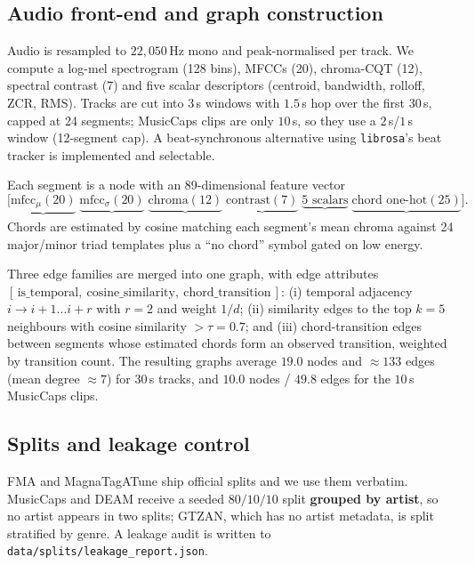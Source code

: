 \documentclass{article}
\begin{document}
\subsection{Audio front-end and graph construction}

Audio is resampled to $22{,}050$\,Hz mono and peak-normalised per track. We compute
a log-mel spectrogram (128 bins), MFCCs (20), chroma-CQT (12), spectral contrast
(7) and five scalar descriptors (centroid, bandwidth, rolloff, ZCR, RMS). Tracks
are cut into $3$\,s windows with $1.5$\,s hop over the first $30$\,s, capped at 24
segments; MusicCaps clips are only $10$\,s, so they use a $2$\,s/$1$\,s window
(12-segment cap). A beat-synchronous alternative using \texttt{librosa}'s beat
tracker is implemented and selectable.

Each segment is a node with an 89-dimensional feature vector
\[
\big[\underbrace{\text{mfcc}_{\mu}(20)}_{}\;
\underbrace{\text{mfcc}_{\sigma}(20)}_{}\;
\underbrace{\text{chroma}(12)}_{}\;
\underbrace{\text{contrast}(7)}_{}\;
\underbrace{\text{5 scalars}}_{}\;
\underbrace{\text{chord one-hot}(25)}_{}\big].
\]
Chords are estimated by cosine matching each segment's mean chroma against 24
major/minor triad templates plus a ``no chord'' symbol gated on low energy.

Three edge families are merged into one graph, with edge attributes
$[\,\text{is\_temporal},\ \text{cosine\_similarity},\ \text{chord\_transition}\,]$:
(i) temporal adjacency $i \rightarrow i{+}1 \ldots i{+}r$ with $r=2$ and weight
$1/d$; (ii) similarity edges to the top $k=5$ neighbours with cosine similarity
$> \tau = 0.7$; and (iii) chord-transition edges between segments whose estimated
chords form an observed transition, weighted by transition count. The resulting
graphs average $19.0$ nodes and $\approx 133$ edges (mean degree $\approx 7$) for
$30$\,s tracks, and $10.0$ nodes / $49.8$ edges for the $10$\,s MusicCaps clips.

\subsection{Splits and leakage control}

FMA and MagnaTagATune ship official splits and we use them verbatim. MusicCaps and
DEAM receive a seeded $80/10/10$ split \textbf{grouped by artist}, so no artist
appears in two splits; GTZAN, which has no artist metadata, is split stratified by
genre. A leakage audit is written to \texttt{data/splits/leakage\_report.json}.
\end{document}

